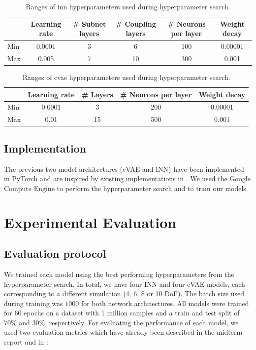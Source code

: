\documentclass[conference]{IEEEtran}
\begin{document}
\begin{table}[ht]
    \caption{Ranges of inn hyperparameters used during hyperparameter search.}
    \label{tab:hyperparameter-ranges-inn}
    \centering
    \begin{tabular}{|l|c|c|c|c|c|}
    \hline
      & Learning rate & \# Subnet layers & \# Coupling layers & \# Neurons per layer & Weight decay \\
     \hline
     Min  & 0.0001 & 3 & 6 & 100 & 0.00001 \\
     Max  & 0.005 & 7 & 10 & 300 & 0.001 \\
     \hline
    \end{tabular}
\end{table}

\begin{table}[ht]
    \caption{Ranges of cvae hyperparameters used during hyperparameter search.}
    \label{tab:hyperparameter-ranges-cvae}
    \centering
    \begin{tabular}{|l|c|c|c|c|}
    \hline
      & Learning rate & \# Layers & \# Neurons per layer & Weight decay \\
     \hline
     Min  & 0.0001 & 3 & 200 & 0.00001 \\
     Max  & 0.01 & 15 & 500 & 0.001 \\
     \hline
    \end{tabular}
\end{table}

\subsection*{Implementation}

The previous two model architectures (cVAE and INN) have been implemented in PyTorch and are inspired by existing implementations in  \cite{graviraja2019, freia2020}. We used the Google Compute Engine to perform the hyperparameter search and to train our models.

\section*{Experimental Evaluation}

\subsection*{Evaluation protocol}

We trained each model using the best performing hyperparameters from the hyperparameter search. In total, we have four INN and four cVAE models, each corresponding to a different simulation (4, 6, 8 or 10 DoF). The batch size used during training was $1000$ for both network architectures. All models were trained for 60 epochs on a dataset with 1 million samples and a train and test split of 70\% and 30\%, respectively. For evaluating the performance of each model, we used two evaluation metrics which have already been described in the midterm report and in \cite{Kruse2019}:
\end{document}
